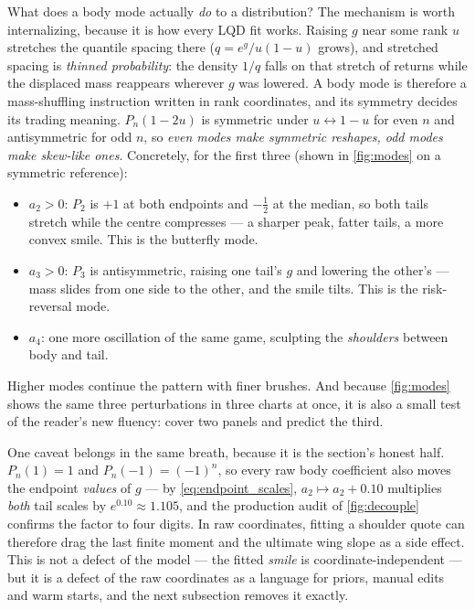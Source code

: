 \documentclass[11pt]{article}
\begin{document}
What does a body mode actually \emph{do} to a distribution?  The mechanism
is worth internalizing, because it is how every LQD fit works.  Raising $g$
near some rank $u$ stretches the quantile spacing there ($q=e^{g}/u(1-u)$
grows), and stretched spacing is \emph{thinned probability}: the density
$1/q$ falls on that stretch of returns while the displaced mass reappears
wherever $g$ was lowered.  A body mode is therefore a mass-shuffling
instruction written in rank coordinates, and its symmetry decides its
trading meaning.  $P_n(1-2u)$ is symmetric under $u\leftrightarrow1-u$ for
even $n$ and antisymmetric for odd $n$, so \emph{even modes make symmetric
reshapes, odd modes make skew-like ones}.  Concretely, for the first three
(shown in \cref{fig:modes} on a symmetric reference):
\begin{itemize}[leftmargin=1.4em]
\item $a_2>0$: $P_2$ is $+1$ at both endpoints and $-\tfrac12$ at the
median, so both tails stretch while the centre compresses --- a sharper
peak, fatter tails, a more convex smile.  This is the butterfly mode.
\item $a_3>0$: $P_3$ is antisymmetric, raising one tail's $g$ and lowering
the other's --- mass slides from one side to the other, and the smile
tilts.  This is the risk-reversal mode.
\item $a_4$: one more oscillation of the same game, sculpting the
\emph{shoulders} between body and tail.
\end{itemize}
Higher modes continue the pattern with finer brushes.  And because
\cref{fig:modes} shows the same three perturbations in three charts at once,
it is also a small test of the reader's new fluency: cover two panels and
predict the third.

One caveat belongs in the same breath, because it is the section's honest
half.  $P_n(1)=1$ and $P_n(-1)=(-1)^n$, so every raw body coefficient also
moves the endpoint \emph{values} of $g$ --- by \eqref{eq:endpoint_scales},
$a_2\mapsto a_2+0.10$ multiplies \emph{both} tail scales by
$e^{0.10}\approx1.105$, and the production audit of \cref{fig:decouple}
confirms the factor to four digits.  In raw coordinates, fitting a shoulder
quote can therefore drag the last finite moment and the ultimate wing slope
as a side effect.  This is not a defect of the model --- the fitted
\emph{smile} is coordinate-independent --- but it is a defect of the raw
coordinates as a language for priors, manual edits and warm starts, and the
next subsection removes it exactly.
\end{document}
